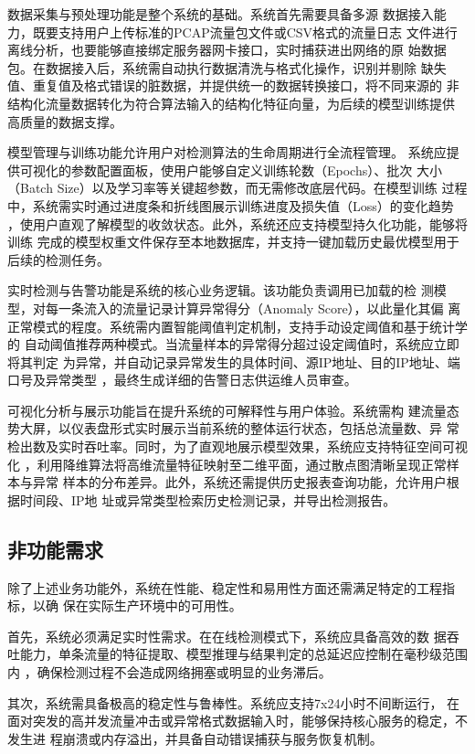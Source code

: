 数据采集与预处理功能是整个系统的基础。系统首先需要具备多源
数据接入能力，既要支持用户上传标准的PCAP流量包文件或CSV格式的流量日志
文件进行离线分析，也要能够直接绑定服务器网卡接口，实时捕获进出网络的原
始数据包。在数据接入后，系统需自动执行数据清洗与格式化操作，识别并剔除
缺失值、重复值及格式错误的脏数据，并提供统一的数据转换接口，将不同来源的
非结构化流量数据转化为符合算法输入的结构化特征向量，为后续的模型训练提供
高质量的数据支撑。

模型管理与训练功能允许用户对检测算法的生命周期进行全流程管理。
系统应提供可视化的参数配置面板，使用户能够自定义训练轮数（Epochs）、批次
大小（Batch Size）以及学习率等关键超参数，而无需修改底层代码。在模型训练
过程中，系统需实时通过进度条和折线图展示训练进度及损失值（Loss）的变化趋势
，使用户直观了解模型的收敛状态。此外，系统还应支持模型持久化功能，能够将训练
完成的模型权重文件保存至本地数据库，并支持一键加载历史最优模型用于后续的检测任务。

实时检测与告警功能是系统的核心业务逻辑。该功能负责调用已加载的检
测模型，对每一条流入的流量记录计算异常得分（Anomaly Score），以此量化其偏
离正常模式的程度。系统需内置智能阈值判定机制，支持手动设定阈值和基于统计学的
自动阈值推荐两种模式。当流量样本的异常得分超过设定阈值时，系统应立即将其判定
为异常，并自动记录异常发生的具体时间、源IP地址、目的IP地址、端口号及异常类型
，最终生成详细的告警日志供运维人员审查。

可视化分析与展示功能旨在提升系统的可解释性与用户体验。系统需构
建流量态势大屏，以仪表盘形式实时展示当前系统的整体运行状态，包括总流量数、异
常检出数及实时吞吐率。同时，为了直观地展示模型效果，系统应支持特征空间可视化
，利用降维算法将高维流量特征映射至二维平面，通过散点图清晰呈现正常样本与异常
样本的分布差异。此外，系统还需提供历史报表查询功能，允许用户根据时间段、IP地
址或异常类型检索历史检测记录，并导出检测报告。

\subsection{非功能需求}

除了上述业务功能外，系统在性能、稳定性和易用性方面还需满足特定的工程指标，以确
保在实际生产环境中的可用性。

首先，系统必须满足实时性需求。在在线检测模式下，系统应具备高效的数
据吞吐能力，单条流量的特征提取、模型推理与结果判定的总延迟应控制在毫秒级范围内
，确保检测过程不会造成网络拥塞或明显的业务滞后。

其次，系统需具备极高的稳定性与鲁棒性。系统应支持7x24小时不间断运行，
在面对突发的高并发流量冲击或异常格式数据输入时，能够保持核心服务的稳定，不发生进
程崩溃或内存溢出，并具备自动错误捕获与服务恢复机制。

